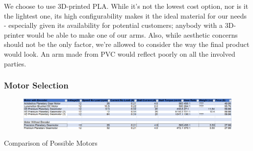 





We choose to use 3D-printed PLA. While it's not the lowest cost option, nor is it the lightest one, its high configurability makes it the ideal material for our needs - especially given its availability for potential customers; anybody with a 3D-printer would be able to make one of our arms. Also, while aesthetic concerns should not be the only factor, we're allowed to consider the way the final product would look. An arm made from PVC would reflect poorly on all the involved parties.


\subsubsection{Motor Selection}
\begin{table}[H]
	\begin{figure}[H]
		\includegraphics[width=\textwidth]{Pictures/motor_chart}
	\end{figure}
	\caption{Comparison of Possible Motors}
	\label{tbl:Motor_Chart}
\end{table}


